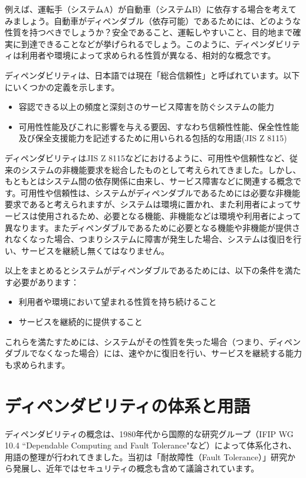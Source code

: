 例えば、運転手（システムA）が自動車（システムB）に依存する場合を考えてみましょう。自動車がディペンダブル（依存可能）であるためには、どのような性質を持つべきでしょうか？安全であること、運転しやすいこと、目的地まで確実に到達できることなどが挙げられるでしょう。このように、ディペンダビリティは利用者や環境によって求められる性質が異なる、相対的な概念です。

ディペンダビリティは、日本語では現在「総合信頼性」と呼ばれています。以下にいくつかの定義を示します。

\begin{itemize}
\item 容認できる以上の頻度と深刻さのサービス障害を防ぐシステムの能力
\item 可用性性能及びこれに影響を与える要因、すなわち信頼性性能、保全性性能及び保全支援能力を記述するために用いられる包括的な用語(JIS Z 8115)
\end{itemize}

ディペンダビリティはJIS Z 8115などにおけるように、可用性や信頼性など、従来のシステムの非機能要求を総合したものとして考えられてきました。しかし、もともとはシステム間の依存関係に由来し、サービス障害などに関連する概念です。可用性や信頼性は、システムがディペンダブルであるためには必要な非機能要求であると考えられますが、システムは環境に置かれ、また利用者によってサービスは使用されるため、必要となる機能、非機能などは環境や利用者によって異なります。またディペンダブルであるために必要となる機能や非機能が提供されなくなった場合、つまりシステムに障害が発生した場合、システムは復旧を行い、サービスを継続し無くてはなりません。

以上をまとめるとシステムがディペンダブルであるためには、以下の条件を満たす必要があります：

\begin{itemize}
\item 利用者や環境において望まれる性質を持ち続けること
\item サービスを継続的に提供すること
\end{itemize}

これらを満たすためには、システムがその性質を失った場合（つまり、ディペンダブルでなくなった場合）には、速やかに復旧を行い、サービスを継続する能力も求められます。

\section{ディペンダビリティの体系と用語}

ディペンダビリティの概念は、1980年代から国際的な研究グループ（IFIP WG 10.4 ``Dependable Computing and Fault Tolerance"など）によって体系化され、用語の整理が行われてきました。当初は「耐故障性（Fault Tolerance）」研究から発展し、近年ではセキュリティの概念も含めて議論されています。


